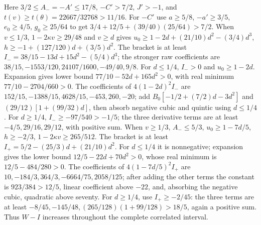 Here $3/2\le A_-=-A'\le17/8$, $-C'>7/2$, $J'>-1$, and
$t(v)\ge t(\theta)=22667/32768>11/16$.
For $-C'$ use $a\ge5/8$, $-a'\ge3/5$, $e_0\ge4/5$,
$g_0\ge25/64$ to get $3/4+12/5+(39/40)(25/64)>7/2$.
When $v\le1/3$, $1-2\kappa v\ge29/48$ and $v\ge d$ gives
$u_0\ge1-2d+(21/10)d^2-(3/4)d^3$,
$h\ge-1+(127/120)d+(3/5)d^2$.
The bracket is at least $I_-=38/15-13d+15d^2-(5/4)d^3$;
the stronger raw coefficients are
$38/15,\allowbreak -1553/120,\allowbreak 24107/1600,\allowbreak -49/40,\allowbreak 9/8$.
For $d\le1/4$, $I_->0$ and $u_0\ge1-2d$.
Expansion gives lower bound $77/10-52d+165d^2>0$, with real
minimum $77/10-2704/660>0$.
The coefficients of $4(1-2d)^2I_-$ are
$152/15,\allowbreak -1388/15,\allowbreak 4628/15,\allowbreak -453,\allowbreak 260,\allowbreak -20$;
add $B_0[-1/2+(7/2)d-3d^2]$ and
$(29/12)[1+(99/32)d]$, then absorb negative cubic and quintic
using $d\le1/4$.
For $d\ge1/4$, $I_-\ge-97/540>-1/5$; the three derivative terms
are at least $-4/5,29/16,29/12$, with positive sum.
When $v\ge1/3$, $A_-\le5/3$, $u_0\ge1-7d/5$, $h\ge-2/3$,
$1-2\kappa v\ge265/512$.
The bracket is at least $I_+=5/2-(25/3)d+(21/10)d^2$.
For $d\le1/4$ it is nonnegative; expansion gives the lower bound
$12/5-22d+70d^2>0$, whose real minimum is
$12/5-484/280>0$.
The coefficients of $4(1-7d/5)^2I_+$ are
$10,-184/3,364/3,-6664/75,2058/125$;
after adding the other terms the constant is $923/384>12/5$,
linear coefficient above $-22$, and, absorbing the negative cubic,
quadratic above seventy.
For $d\ge1/4$, use $I_+\ge-2/45$: the three terms are at least
$-8/45,\allowbreak -145/48,\allowbreak (265/128)(1+99/128)>18/5$, again a positive sum.
Thus $W-I$ increases throughout the complete correlated interval.

